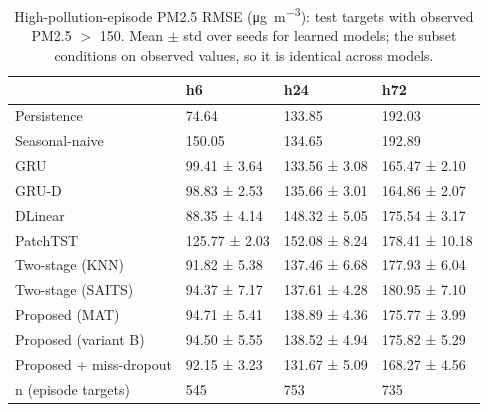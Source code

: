 \begin{table}
\caption{High-pollution-episode PM2.5 RMSE (\si{\micro\gram\per\cubic\metre}): test targets with observed PM2.5 $>$ 150. Mean $\pm$ std over seeds for learned models; the subset conditions on observed values, so it is identical across models.}
\label{tab:episode}
\begin{tabular}{llll}
\toprule
 & h6 & h24 & h72 \\
\midrule
Persistence & 74.64 & 133.85 & 192.03 \\
Seasonal-naive & 150.05 & 134.65 & 192.89 \\
GRU & 99.41 ± 3.64 & 133.56 ± 3.08 & 165.47 ± 2.10 \\
GRU-D & 98.83 ± 2.53 & 135.66 ± 3.01 & 164.86 ± 2.07 \\
DLinear & 88.35 ± 4.14 & 148.32 ± 5.05 & 175.54 ± 3.17 \\
PatchTST & 125.77 ± 2.03 & 152.08 ± 8.24 & 178.41 ± 10.18 \\
Two-stage (KNN) & 91.82 ± 5.38 & 137.46 ± 6.68 & 177.93 ± 6.04 \\
Two-stage (SAITS) & 94.37 ± 7.17 & 137.61 ± 4.28 & 180.95 ± 7.10 \\
Proposed (MAT) & 94.71 ± 5.41 & 138.89 ± 4.36 & 175.77 ± 3.99 \\
Proposed (variant B) & 94.50 ± 5.55 & 138.52 ± 4.94 & 175.82 ± 5.29 \\
Proposed + miss-dropout & 92.15 ± 3.23 & 131.67 ± 5.09 & 168.27 ± 4.56 \\
n (episode targets) & 545 & 753 & 735 \\
\bottomrule
\end{tabular}
\end{table}
